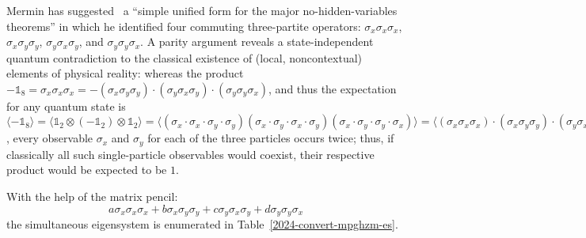 \documentclass[
  twocolumn,
 showpacs,
 showkeys,
 preprintnumbers,
 amsmath,amssymb,
 aps,
 prl,
  longbibliography,
 floatfix,
 ]{revtex4-2}
\newcommand\myotimes{ }
\begin{document}
Mermin has suggested~\cite{mermin,mermin90b} a ``simple unified form for the major no-hidden-variables theorems'' in which he identified four commuting three-partite operators:
$\sigma_x \myotimes  \sigma_x \myotimes  \sigma_x$, $\sigma_x \myotimes  \sigma_y \myotimes  \sigma_y$, $\sigma_y \myotimes  \sigma_x \myotimes  \sigma_y$, and $\sigma_y \myotimes  \sigma_y \myotimes  \sigma_x$.
A parity argument reveals a state-independent quantum contradiction to the classical existence of (local, noncontextual) elements of physical reality: whereas the product
$  -\mathbb{1}_8 = \sigma_x \myotimes  \sigma_x \myotimes  \sigma_x = -  (\sigma_x \myotimes  \sigma_y \myotimes  \sigma_y) \cdot (\sigma_y \myotimes  \sigma_x \myotimes  \sigma_y) \cdot (\sigma_y \myotimes  \sigma_y \myotimes  \sigma_x)$,
and thus the expectation for any quantum state is
$
\langle
-\mathbb{1}_8
 \rangle
=
\langle
\mathbb{1}_2
\otimes
(
-\mathbb{1}_2
)
\otimes
\mathbb{1}_2
 \rangle
=
\langle
(
\sigma_x  \cdot \sigma_x  \cdot \sigma_y   \cdot \sigma_y
)
\myotimes
(
\sigma_x   \cdot \sigma_y   \cdot \sigma_x   \cdot  \sigma_y
)
\myotimes
(
\sigma_x   \cdot \sigma_y    \cdot \sigma_y    \cdot \sigma_x
) \rangle
=
\langle  (\sigma_x \myotimes  \sigma_x \myotimes  \sigma_x) \cdot (\sigma_x \myotimes  \sigma_y \myotimes  \sigma_y) \cdot (\sigma_y \myotimes  \sigma_x \myotimes  \sigma_y) \cdot (\sigma_y \myotimes  \sigma_y \myotimes  \sigma_x) \rangle
=
\langle  \sigma_x \myotimes  \sigma_x \myotimes  \sigma_x  \rangle \langle \sigma_x \myotimes  \sigma_y \myotimes  \sigma_y  \rangle \langle
\sigma_y \myotimes  \sigma_x \myotimes  \sigma_y  \rangle \langle   \sigma_y \myotimes  \sigma_y \myotimes  \sigma_x \rangle
= -1$,
every observable $\sigma_x$ and $\sigma_y$ for each of the three particles occurs twice; thus, if classically all such single-particle observables would coexist, their respective product would be expected to be $1$.

With the help of the matrix pencil:
\begin{equation}
a \sigma_x \myotimes  \sigma_x \myotimes  \sigma_x + b \sigma_x \myotimes  \sigma_y \myotimes  \sigma_y + c \sigma_y \myotimes  \sigma_x \myotimes  \sigma_y + d \sigma_y \myotimes  \sigma_y \myotimes  \sigma_x
\label{2024-convert-mpghzm}
\end{equation}
the simultaneous eigensystem is enumerated in Table~\ref{2024-convert-mpghzm-es}.
\end{document}
